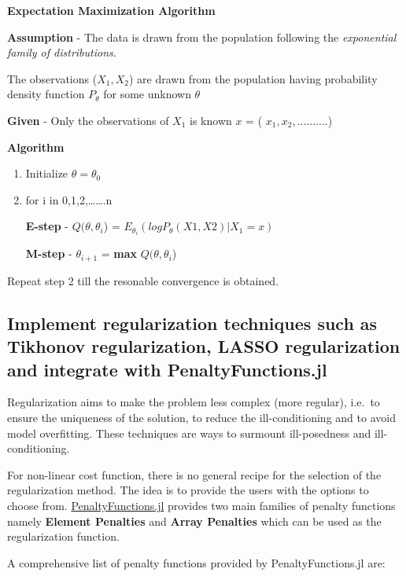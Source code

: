 \documentclass[11pt]{article}
\begin{document}
\textbf{Expectation Maximization Algorithm}

\textbf{Assumption} - The data is drawn from the population following
the \emph{exponential family of distributions}.

The observations (\(X_{1},X_{2}\)) are drawn from the population having
probability density function \(P_{\theta}\) for some unknown \(\theta\)

\textbf{Given} - Only the observations of \(X_{1}\) is known \(x\) = (
\(x_{1},x_{2},..........\))

\textbf{Algorithm}

\begin{enumerate}
\def\labelenumi{\arabic{enumi}.}
\item
  Initialize \(\theta = \theta_{0}\)
\item
  for i in 0,1,2,\ldots{}\ldots{}.n

  \textbf{E-step} - \(Q(\theta, \theta_{i}\)) =
  \(E_{\theta_{i}}(logP_{\theta}(X1,X2)|X_{1} = x)\)

  \textbf{M-step} - \(\theta_{i+1}\) = \textbf{max}
  \(Q(\theta, \theta_{i}\))
\end{enumerate}

Repeat step 2 till the resonable convergence is obtained.

    \subsection{Implement regularization techniques such as Tikhonov
regularization, LASSO regularization and integrate with
PenaltyFunctions.jl}\label{implement-regularization-techniques-such-as-tikhonov-regularization-lasso-regularization-and-integrate-with-penaltyfunctions.jl}

Regularization aims to make the problem less complex (more regular),
i.e.~to ensure the uniqueness of the solution, to reduce the
ill-conditioning and to avoid model overfitting. These techniques are
ways to surmount ill-posedness and ill-conditioning.

For non-linear cost function, there is no general recipe for the
selection of the regularization method. The idea is to provide the users
with the options to choose from.
\href{https://github.com/JuliaML/PenaltyFunctions.jl}{PenaltyFunctions.jl}
provides two main families of penalty functions namely \textbf{Element
Penalties} and \textbf{Array Penalties} which can be used as the
regularization function.

A comprehensive list of penalty functions provided by
PenaltyFunctions.jl are:
\end{document}
